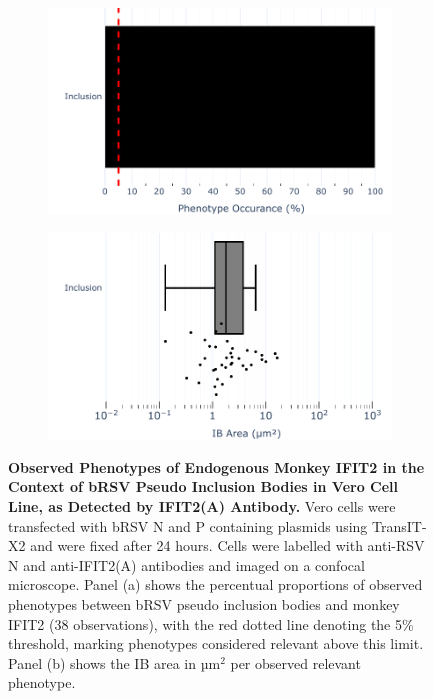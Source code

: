 \begin{figure}
    \begin{subfigure}{0.495\textwidth}
        \caption{}
        \includegraphics[width=1\linewidth]{09. Chapter 4/Figs/01. pIB/03. IFIT2/02. IFIT2A/07. bar_i2a_vero_bnbp.pdf} 
    \end{subfigure}
    \begin{subfigure}{0.495\textwidth}
        \caption{}
        \includegraphics[width=1\linewidth]{09. Chapter 4/Figs/01. pIB/03. IFIT2/02. IFIT2A/08. box_i2a_vero_bnbp.pdf}
    \end{subfigure}
    \caption[Observed Phenotypes of Endogenous Monkey IFIT2 in the Context of bRSV Pseudo Inclusion Bodies in Vero Cell Line, as Detected by IFIT2(A) Antibody.]{\textbf{Observed Phenotypes of Endogenous Monkey IFIT2 in the Context of bRSV Pseudo Inclusion Bodies in Vero Cell Line, as Detected by IFIT2(A) Antibody.} Vero cells were transfected with bRSV N and P containing plasmids using TransIT-X2 and were fixed after 24 hours. Cells were labelled with anti-RSV N and anti-IFIT2(A) antibodies and imaged on a confocal microscope. Panel (a) shows the percentual proportions of observed phenotypes between bRSV pseudo inclusion bodies and monkey IFIT2 (38 observations), with the red dotted line denoting the 5\% threshold, marking phenotypes considered relevant above this limit. Panel (b) shows the IB area in \(\mbox{µm}^2\) per observed relevant phenotype.}
    \label{fig:Observed Phenotypes of Endogenous Monkey IFIT2 in the Context of bRSV Pseudo Inclusion Bodies in Vero Cell Line, as Detected by IFIT2(A) Antibody}
\end{figure}

